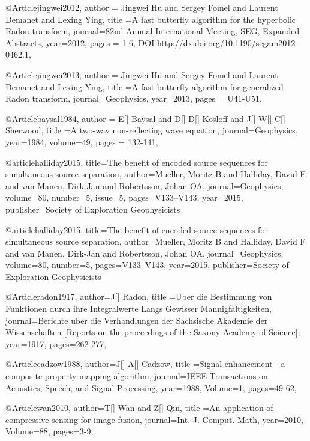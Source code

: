 @Article{jingwei2012,
  author = {Jingwei Hu and Sergey Fomel and Laurent Demanet and Lexing Ying},
  title ={A fast butterfly algorithm for the hyperbolic Radon transform},
  journal={82nd Annual International Meeting, SEG, Expanded Abstracts},
  year=2012,
  pages = {1-6, DOI http://dx.doi.org/10.1190/segam2012-0462.1},
}

@Article{jingwei2013,
  author = {Jingwei Hu and Sergey Fomel and Laurent Demanet and Lexing Ying},
  title ={A fast butterfly algorithm for generalized Radon transform},
  journal={Geophysics},
  year=2013,
  pages = {U41-U51},
}

@Article{baysal1984,
  author = {E[] Baysal and D[] D[] Kosloff and J[] W[] C[] Sherwood},
  title ={A two-way non-reflecting wave equation},
  journal={Geophysics},
  year=1984,
  volume={49},
  pages = {132-141},
}



@article{halliday2015,
  title={The benefit of encoded source sequences for simultaneous source separation},
  author={Mueller, Moritz B and Halliday, David F and van Manen, Dirk-Jan and Robertsson, Johan OA},
  journal={Geophysics},
  volume={80},
  number={5},
  issue=5,
  pages={V133--V143},
  year={2015},
  publisher={Society of Exploration Geophysicists}
}

@article{halliday2015,
  title={The benefit of encoded source sequences for simultaneous source separation},
  author={Mueller, Moritz B and Halliday, David F and van Manen, Dirk-Jan and Robertsson, Johan OA},
  journal={Geophysics},
  volume={80},
  number={5},
  pages={V133--V143},
  year={2015},
  publisher={Society of Exploration Geophysicists}
}


@Article{radon1917,
  author={J[] Radon},
  title ={Uber die Bestimmung von Funktionen durch ihre Integralwerte Langs Gewisser Mannigfaltigkeiten},
  journal={Berichte uber die Verhandlungen der Sachsische Akademie der Wissenschaften [Reports on the proceedings of the Saxony Academy of Science]},
  year=1917,
  pages={262-277},
}

@Article{cadzow1988,
  author={J[] A[] Cadzow},
  title ={Signal enhancement - a composite property mapping algorithm},
  journal={IEEE Transactions on Acoustics, Speech, and Signal Processing},
  year=1988,
  Volume=1,
  pages={49-62},
}

@Article{wan2010,
  author={T[] Wan and Z[] Qin},
  title ={An application of compressive sensing for image fusion},
  journal={Int. J. Comput. Math},
  year=2010,
  Volume=88,
  pages={3-9},
}

